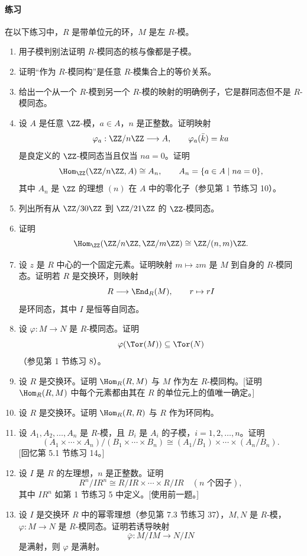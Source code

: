 \paragraph{练习}
在以下练习中，$R$ 是带单位元的环，$M$ 是左 $R$-模。
\begin{enumerate}[label=\arabic*.]
	\item 用子模判别法证明 $R$-模同态的核与像都是子模。
	\item 证明“作为 $R$-模同构”是任意 $R$-模集合上的等价关系。
	\item 给出一个从一个 $R$-模到另一个 $R$-模的映射的明确例子，它是群同态但不是 $R$-模同态。
	\item 设 $A$ 是任意 $\ZZ$-模，$a\in A$，$n$ 是正整数。证明映射
	\[
	\varphi_a:\ZZ/n\ZZ\longrightarrow A,\qquad \varphi_a(\bar k)=ka
	\]
	是良定义的 $\ZZ$-模同态当且仅当 $na=0$。证明
	\[
	\Hom_{\ZZ}(\ZZ/n\ZZ,A)\cong A_n,
	\qquad A_n=\{a\in A\mid na=0\},
	\]
	其中 $A_n$ 是 $\ZZ$ 的理想 $(n)$ 在 $A$ 中的零化子（参见第 1 节练习 10）。
	\item 列出所有从 $\ZZ/30\ZZ$ 到 $\ZZ/21\ZZ$ 的 $\ZZ$-模同态。
	\item 证明
	\[
	\Hom_{\ZZ}(\ZZ/n\ZZ,\ZZ/m\ZZ)\cong \ZZ/(n,m)\ZZ.
	\]
	\item 设 $z$ 是 $R$ 中心的一个固定元素。证明映射 $m\mapsto zm$ 是 $M$ 到自身的 $R$-模同态。证明若 $R$ 是交换环，则映射
	\[
	R\longrightarrow \End_R(M),\qquad r\mapsto rI
	\]
	是环同态，其中 $I$ 是恒等自同态。
	\item 设 $\varphi:M\to N$ 是 $R$-模同态。证明
	\[
	\varphi(\Tor(M))\subseteq \Tor(N)
	\]
	（参见第 1 节练习 8）。
	\item 设 $R$ 是交换环。证明 $\Hom_R(R,M)$ 与 $M$ 作为左 $R$-模同构。[证明 $\Hom_R(R,M)$ 中每个元素都由其在 $R$ 的单位元上的值唯一确定。]
	\item 设 $R$ 是交换环。证明 $\Hom_R(R,R)$ 与 $R$ 作为环同构。
	\item 设 $A_1,A_2,\ldots,A_n$ 是 $R$-模，且 $B_i$ 是 $A_i$ 的子模，$i=1,2,\ldots,n$。证明
	\[
	(A_1\times\cdots\times A_n)/(B_1\times\cdots\times B_n)
	\cong (A_1/B_1)\times\cdots\times(A_n/B_n).
	\]
	[回忆第 5.1 节练习 14。]
	\item 设 $I$ 是 $R$ 的左理想，$n$ 是正整数。证明
	\[
	R^n/IR^n\cong R/IR\times\cdots\times R/IR\quad(n\text{ 个因子}),
	\]
	其中 $IR^n$ 如第 1 节练习 5 中定义。[使用前一题。]
	\item 设 $I$ 是交换环 $R$ 中的幂零理想（参见第 7.3 节练习 37），$M,N$ 是 $R$-模，$\varphi:M\to N$ 是 $R$-模同态。证明若诱导映射
	\[
	\bar\varphi:M/IM\longrightarrow N/IN
	\]
	是满射，则 $\varphi$ 是满射。

\end{enumerate}
